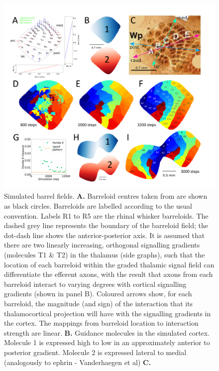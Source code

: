 \documentclass[9pt,twocolumn,twoside,lineno]{pnas-new}
\begin{document}
\begin{figure}
\begin{center}
\includegraphics[width=\textwidth]{../briefpaper/MainFig.png}
\end{center}
\caption{Simulated barrel fields. \textbf{A.} Barreloid centres taken from
  \cite{haidarliu_size_2001} are shown as black circles. Barreloids are
  labelled according to the usual convention. Labels R1 to R5 are the rhinal
  whisker barreloids. The dashed grey line represents the boundary of the
  barreloid field; the dot-dash line shows the anterior-posterior axis. It is
  assumed that there are two linearly increasing, orthogonal signalling
  gradients (molecules T1 \& T2) in the thalamus (side graphs), such that the
  location of each barreloid within the graded thalamic signal field can
  differentiate the efferent axons, with the result that axons from each
  barreloid interact to varying degrees with cortical signalling gradients
  (shown in panel B). Coloured arrows show, for each barreloid, the magnitude
  (and sign) of the interaction that its thalamocortical projection will have
  with the signalling gradients in the cortex. The mappings from barreloid
  location to interaction strength are linear. \textbf{B.} Guidance molecules
  in the simulated cortex. Molecule 1 is expressed high to low in an
  approximately anterior to posterior gradient. Molecule 2 is expressed
  lateral to medial (analogously to ephrin - Vanderhaegen et al) \textbf{C.}
}
\end{figure}
\end{document}
